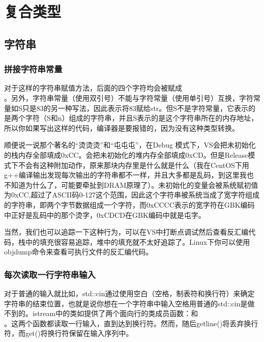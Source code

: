 
\chapter{复合类型}

\addtocounter{section}{1}

\section{字符串}

\subsection{拼接字符串常量}

对于这样的字符串赋值方法，后面的四个字符均会被赋成\\ \leftqm{}\rightqm。另外，字符串常量（使用双引号）不能与字符常量（使用单引号）互换，字符常量如S只是83的另一种写法，因此表示将83赋给str。但S不是字符常量，它表示的是两个字符（S和\mybackslash n）组成的字符串，并且S表示的是这个字符串所在的内存地址，所以你如果写出这样的代码，编译器是要报错的，因为没有这种类型转换。\dpar

顺便说一说那个著名的“烫烫烫”和“屯屯屯”，在Debug 模式下，VS会把未初始化的栈内存全部填成0xCC。会把未初始化的堆内存全部填成0xCD。但是Release模式下不会有这种附加动作，原来那块内存里是什么就是什么（我在CentOS下用g++编译输出发现每次输出的字符串都不一样，并且大多都是乱码，到这里我也不知道为什么了，可能要牵扯到DRAM原理了）。未初始化的变量会被系统赋初值为0xCC,超过了ASCII码0-127这个范围，因此这个字符串被系统当成了宽字符组成的字符串，即两个字节数据组成一个字符，而0xCCCC表示的宽字符在GBK编码中正好是乱码中的那个烫字，0xCDCD在GBK编码中就是屯字。

当然，我们也可以追踪一下这种行为，可以在VS中打断点调试然后查看反汇编代码，栈中的填充很容易追踪，堆中的填充就不太好追踪了。Linux下你可以使用objdump命令来查看可执行文件的反汇编代码。

\addtocounter{subsection}{2}

\subsection{每次读取一行字符串输入}

对于普通的输入就比如，std::cin通过使用空白（空格，制表符和换行符）来确定字符串的结束位置，也就是说你想在一个字符串中输入空格用普通的std::cin是做不到的。istream中的类如提供了两个面向行的类成员函数：和\\ 。这两个函数都读取一行输入，直到达到换行符。然而，随后getline()将丢弃换行符，而get()将换行符保留在输入序列中。

